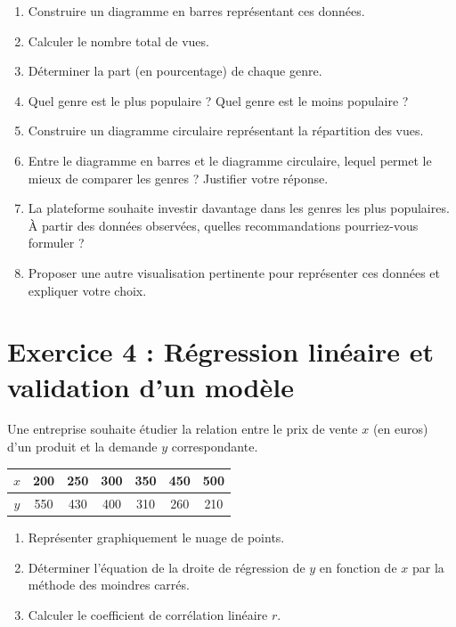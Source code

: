 \documentclass[12pt,a4paper]{article}
\begin{document}
\begin{enumerate}
\begin{enumerate}
\item Construire un diagramme en barres représentant ces données.
\item Calculer le nombre total de vues.
\item Déterminer la part (en pourcentage) de chaque genre.
\item Quel genre est le plus populaire ? Quel genre est le moins populaire ?
\item Construire un diagramme circulaire représentant la répartition des vues.
\item Entre le diagramme en barres et le diagramme circulaire, lequel permet le mieux de comparer les genres ? Justifier votre réponse.
\item La plateforme souhaite investir davantage dans les genres les plus populaires. À partir des données observées, quelles recommandations pourriez-vous formuler ?
\item Proposer une autre visualisation pertinente pour représenter ces données et expliquer votre choix.
\end{enumerate}


\section*{Exercice 4 : Régression linéaire et validation d'un modèle}

Une entreprise souhaite étudier la relation entre le prix de vente $x$ (en euros) d'un produit et la demande $y$ correspondante.
\begin{center}
\begin{tabular}{|c|c|c|c|c|c|c|}
\hline
$x$ & 200 & 250 & 300 & 350 & 450 & 500\\
\hline
$y$ & 550 & 430 & 400 & 310 & 260 & 210\\
\hline
\end{tabular}
\end{center}
\begin{enumerate}
\item Représenter graphiquement le nuage de points.

\item Déterminer l'équation de la droite de régression de $y$ en fonction de $x$ par la méthode des moindres carrés.

\item Calculer le coefficient de corrélation linéaire $r$.


\end{enumerate}
\end{enumerate}
\end{document}

